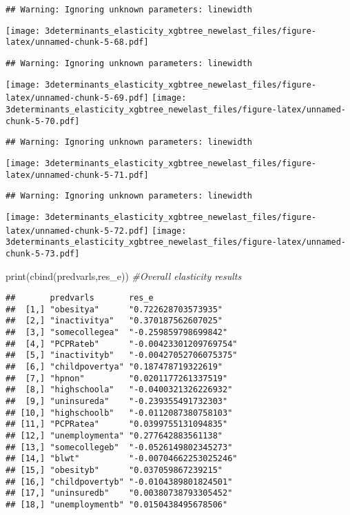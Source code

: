 \documentclass[
]{article}
\newenvironment{Shaded}{\begin{snugshade}}{\end{snugshade}}
\newcommand{\CommentTok}[1]{\textcolor[rgb]{0.56,0.35,0.01}{\textit{#1}}}
\newcommand{\FunctionTok}[1]{\textcolor[rgb]{0.00,0.00,0.00}{#1}}
\newcommand{\NormalTok}[1]{#1}
\begin{document}
\begin{verbatim}
## Warning: Ignoring unknown parameters: linewidth
\end{verbatim}

\texttt{[image: 3determinants\_elasticity\_xgbtree\_newelast\_files/figure-latex/unnamed-chunk-5-68.pdf]}

\begin{verbatim}
## Warning: Ignoring unknown parameters: linewidth
\end{verbatim}

\texttt{[image: 3determinants\_elasticity\_xgbtree\_newelast\_files/figure-latex/unnamed-chunk-5-69.pdf]}
\texttt{[image: 3determinants\_elasticity\_xgbtree\_newelast\_files/figure-latex/unnamed-chunk-5-70.pdf]}

\begin{verbatim}
## Warning: Ignoring unknown parameters: linewidth
\end{verbatim}

\texttt{[image: 3determinants\_elasticity\_xgbtree\_newelast\_files/figure-latex/unnamed-chunk-5-71.pdf]}

\begin{verbatim}
## Warning: Ignoring unknown parameters: linewidth
\end{verbatim}

\texttt{[image: 3determinants\_elasticity\_xgbtree\_newelast\_files/figure-latex/unnamed-chunk-5-72.pdf]}
\texttt{[image: 3determinants\_elasticity\_xgbtree\_newelast\_files/figure-latex/unnamed-chunk-5-73.pdf]}

\begin{Shaded}
\begin{Highlighting}[]
\FunctionTok{print}\NormalTok{(}\FunctionTok{cbind}\NormalTok{(predvarls,res\_e)) }\CommentTok{\#Overall elasticity results}
\end{Highlighting}
\end{Shaded}

\begin{verbatim}
##       predvarls       res_e                 
##  [1,] "obesitya"      "0.722628703573935"   
##  [2,] "inactivitya"   "0.370187562607025"   
##  [3,] "somecollegea"  "-0.259859798699842"  
##  [4,] "PCPRateb"      "-0.00423301209769754"
##  [5,] "inactivityb"   "-0.00427052706075375"
##  [6,] "childpovertya" "0.187478719322619"   
##  [7,] "hpnon"         "0.0201177261337519"  
##  [8,] "highschoola"   "-0.0400321326226932" 
##  [9,] "uninsureda"    "-0.239355491732303"  
## [10,] "highschoolb"   "-0.0112087380758103" 
## [11,] "PCPRatea"      "0.0399755131094835"  
## [12,] "unemploymenta" "0.277642883561138"   
## [13,] "somecollegeb"  "-0.0526149802345273" 
## [14,] "blwt"          "-0.00704662253025246"
## [15,] "obesityb"      "0.037059867239215"   
## [16,] "childpovertyb" "-0.0104389801824501" 
## [17,] "uninsuredb"    "0.00380738793305452" 
## [18,] "unemploymentb" "0.0150438495678506"
\end{verbatim}
\end{document}
